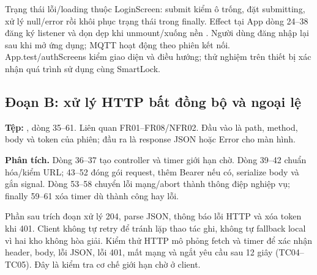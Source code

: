 Trạng thái lỗi/loading thuộc LoginScreen: submit kiểm ô trống, đặt submitting, xử lý null/error rồi khôi phục trạng thái trong finally. Effect tại App dòng 24--38 đăng ký listener và dọn dẹp khi unmount/xuống nền \cite{react}. Người dùng đăng nhập lại sau khi mở ứng dụng; MQTT hoạt động theo phiên kết nối. App.test/authScreens kiểm giao diện và điều hướng; thử nghiệm trên thiết bị xác nhận quá trình sử dụng cùng SmartLock.

\par\noindent\begin{minipage}{\linewidth}
\setlength{\parindent}{1cm}
\subsection{Đoạn B: xử lý HTTP bất đồng bộ và ngoại lệ}
\textbf{Tệp:} , dòng 35--61. Liên quan FR01--FR08/NFR02. Đầu vào là path, method, body và token của phiên; đầu ra là response JSON hoặc Error cho màn hình.

\end{minipage}\par\smallskip
\textbf{Phân tích.} Dòng 36--37 tạo controller và timer giới hạn chờ. Dòng 39--42 chuẩn hóa/kiểm URL; 43--52 đóng gói request, thêm Bearer nếu có, serialize body và gắn signal. Dòng 53--58 chuyển lỗi mạng/abort thành thông điệp nghiệp vụ; finally 59--61 xóa timer dù thành công hay lỗi.

Phần sau trích đoạn xử lý 204, parse JSON, thông báo lỗi HTTP và xóa token khi 401. Client không tự retry để tránh lặp thao tác ghi, không tự fallback local vì hai kho không hòa giải. Kiểm thử HTTP mô phỏng fetch và timer để xác nhận header, body, lỗi JSON, lỗi 401, mất mạng và ngắt yêu cầu sau 12 giây (TC04--TC05). Đây là kiểm tra cơ chế giới hạn chờ ở client.

